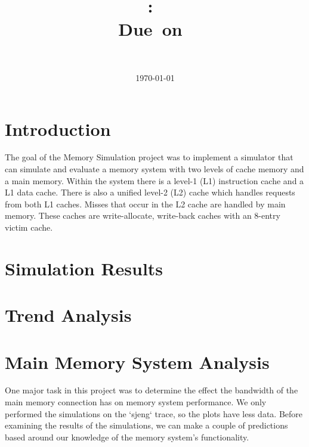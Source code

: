 \documentclass{article}
\title{
\vspace{2in}
\textmd{\textbf{\hmwkClass:\ \hmwkTitle}}\\
\normalsize\vspace{0.1in}\small{Due\ on\ \hmwkDueDate}\\
\vspace{3in}
}
\author{
\textbf{\hmwkAuthorName} \\
\hmwkAuthorNumber
}
\date{\today} %
\begin{document}
\maketitle



\newpage


\section{Introduction}

The goal of the Memory Simulation project was to implement a simulator that can simulate and evaluate a memory system with two levels of cache memory and a main memory. Within the system there is a level-1 (L1) instruction cache and a L1 data cache. There is also a unified level-2 (L2) cache which handles requests from both L1 caches. Misses that occur in the L2 cache are handled by main memory. These caches are write-allocate, write-back caches with an 8-entry victim cache. 

\section{Simulation Results}

\section{Trend Analysis}

\section{Main Memory System Analysis}

One major task in this project was to determine the effect the bandwidth of the
main memory connection has on memory system performance. We only performed the
simulations on the `sjeng` trace, so the plots have less data. Before examining
the results of the simulations, we can make a couple of predictions based around
our knowledge of the memory system's functionality.
\end{document}
